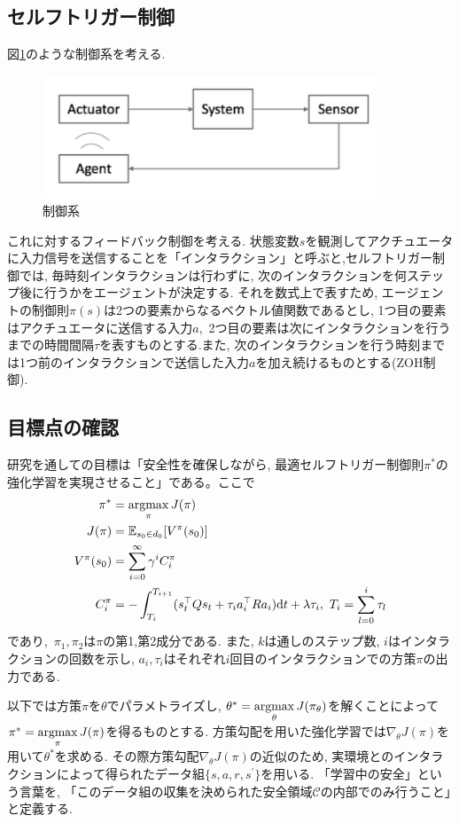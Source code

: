 \documentclass{jsarticle}
\newcommand{\argmax}{\mathop{\rm argmax}\limits}
\newcommand{\expect}{\mathbb{E}}
\begin{document}
\subsection{セルフトリガー制御}
図\ref{image}のような制御系を考える.
\begin{figure}[h]
	\centering
 	\includegraphics[width=10cm]{event.png}
 	\caption{制御系} \label{image}
\end{figure}\par
これに対するフィードバック制御を考える. 状態変数$s$を観測してアクチュエータに入力信号を送信することを「インタラクション」と呼ぶと,セルフトリガー制御では, 毎時刻インタラクションは行わずに, 次のインタラクションを何ステップ後に行うかをエージェントが決定する. それを数式上で表すため, エージェントの制御則$\pi(s)$は2つの要素からなるベクトル値関数であるとし, 1つ目の要素はアクチュエータに送信する入力$a$,~2つ目の要素は次にインタラクションを行うまでの時間間隔$\tau$を表すものとする.また, 次のインタラクションを行う時刻までは1つ前のインタラクションで送信した入力$a$を加え続けるものとする(ZOH制御).

\subsection{目標点の確認}
研究を通しての目標は「安全性を確保しながら, 最適セルフトリガー制御則$\pi^{*}$の強化学習を実現させること」である。ここで
\begin{align}
	\pi^{*} &= \argmax_{\pi}J(\pi) \\
	J(\pi) &= \expect_{s_0\in d_0}[V^{\pi}(s_0)] \\
	V^{\pi}(s_0) &= \sum_{i=0}^{\infty} \gamma^i C^{\pi}_i\\
	C^{\pi}_i &= -\int_{T_i}^{T_{i+1}}(s_t^{\top}Qs_t+\tau_ia_i^{\top}Ra_i)\textrm{d}t + \lambda \tau_i, ~T_i = \sum_{l=0}^{i} \tau_l
\end{align}
であり,~$\pi_1, \pi_2$は$\pi$の第1,第2成分である. また, $k$は通しのステップ数, $i$はインタラクションの回数を示し, $a_i, \tau_i$はそれぞれ$i$回目のインタラクションでの方策$\pi$の出力である. \par
以下では方策$\pi$を$\theta$でパラメトライズし, $\theta^{*} = \argmax_{\theta}J(\pi_{\theta})$を解くことによって$\pi^{*} = \argmax_{\pi}J(\pi)$を得るものとする. 方策勾配を用いた強化学習では$\nabla_{\theta}J(\pi)$を用いて$\theta^{*}$を求める. その際方策勾配$\nabla_{\theta}J(\pi)$の近似のため, 実環境とのインタラクションによって得られたデータ組$\{s,a,r,s^{\prime}\}$を用いる. 「学習中の安全」という言葉を, 「このデータ組の収集を決められた安全領域$\mathcal{C}$の内部でのみ行うこと」と定義する.\par
\end{document}
